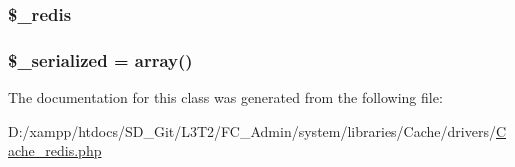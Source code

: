 \subsubsection[{\$\+\_\+redis}]{\setlength{\rightskip}{0pt plus 5cm}\$\+\_\+redis\hspace{0.3cm}{\ttfamily [protected]}}\label{class_c_i___cache__redis_a36de60a8fcbe3efac91a87577d0728de}
\hypertarget{class_c_i___cache__redis_a138ded30ad61d04611681cdf7060a6cf}{}
\subsubsection[{\$\+\_\+serialized}]{\setlength{\rightskip}{0pt plus 5cm}\$\+\_\+serialized = array()\hspace{0.3cm}{\ttfamily [protected]}}\label{class_c_i___cache__redis_a138ded30ad61d04611681cdf7060a6cf}


The documentation for this class was generated from the following file\+:\begin{DoxyCompactItemize}
\item 
D\+:/xampp/htdocs/\+S\+D\+\_\+\+Git/\+L3\+T2/\+F\+C\+\_\+\+Admin/system/libraries/\+Cache/drivers/\hyperlink{_cache__redis_8php}{Cache\+\_\+redis.\+php}\end{DoxyCompactItemize}
